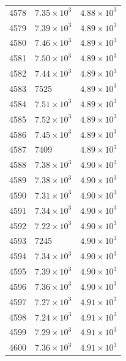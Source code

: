 \begin{table}[H]
\begin{tabular}{lll}
4578 & $\displaystyle 7.35 \times 10^{3}$ & $\displaystyle 4.88 \times 10^{3}$ \\
4579 & $\displaystyle 7.39 \times 10^{3}$ & $\displaystyle 4.89 \times 10^{3}$ \\
4580 & $\displaystyle 7.46 \times 10^{3}$ & $\displaystyle 4.89 \times 10^{3}$ \\
4581 & $\displaystyle 7.50 \times 10^{3}$ & $\displaystyle 4.89 \times 10^{3}$ \\
4582 & $\displaystyle 7.44 \times 10^{3}$ & $\displaystyle 4.89 \times 10^{3}$ \\
4583 & 7525 & $\displaystyle 4.89 \times 10^{3}$ \\
4584 & $\displaystyle 7.51 \times 10^{3}$ & $\displaystyle 4.89 \times 10^{3}$ \\
4585 & $\displaystyle 7.52 \times 10^{3}$ & $\displaystyle 4.89 \times 10^{3}$ \\
4586 & $\displaystyle 7.45 \times 10^{3}$ & $\displaystyle 4.89 \times 10^{3}$ \\
4587 & 7409 & $\displaystyle 4.89 \times 10^{3}$ \\
4588 & $\displaystyle 7.38 \times 10^{3}$ & $\displaystyle 4.90 \times 10^{3}$ \\
4589 & $\displaystyle 7.38 \times 10^{3}$ & $\displaystyle 4.90 \times 10^{3}$ \\
4590 & $\displaystyle 7.31 \times 10^{3}$ & $\displaystyle 4.90 \times 10^{3}$ \\
4591 & $\displaystyle 7.34 \times 10^{3}$ & $\displaystyle 4.90 \times 10^{3}$ \\
4592 & $\displaystyle 7.22 \times 10^{3}$ & $\displaystyle 4.90 \times 10^{3}$ \\
4593 & 7245 & $\displaystyle 4.90 \times 10^{3}$ \\
4594 & $\displaystyle 7.34 \times 10^{3}$ & $\displaystyle 4.90 \times 10^{3}$ \\
4595 & $\displaystyle 7.39 \times 10^{3}$ & $\displaystyle 4.90 \times 10^{3}$ \\
4596 & $\displaystyle 7.36 \times 10^{3}$ & $\displaystyle 4.90 \times 10^{3}$ \\
4597 & $\displaystyle 7.27 \times 10^{3}$ & $\displaystyle 4.91 \times 10^{3}$ \\
4598 & $\displaystyle 7.24 \times 10^{3}$ & $\displaystyle 4.91 \times 10^{3}$ \\
4599 & $\displaystyle 7.29 \times 10^{3}$ & $\displaystyle 4.91 \times 10^{3}$ \\
4600 & $\displaystyle 7.36 \times 10^{3}$ & $\displaystyle 4.91 \times 10^{3}$ \\

\end{tabular}
\end{table}
